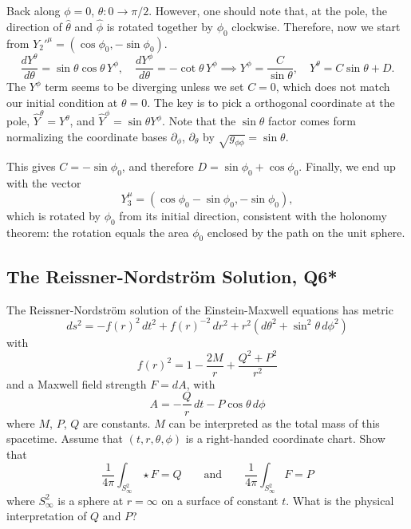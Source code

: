 \begin{solution}
    Back along $\phi = 0$, $\theta: 0\to\pi/2$. However, one should note that, at the pole, the direction of $\hat{\theta}$ and $\hat{\phi}$ is rotated together by $\phi_0$ clockwise. Therefore, now we start from $Y_2'^\mu = (\cos\phi_0,-\sin\phi_0)$.
    \begin{equation}
        \frac{dY^\theta}{d\theta} = \sin\theta\cos\theta\, Y^\phi, \quad
        \frac{dY^\phi}{d\theta} = -\cot\theta\, Y^\phi \implies  Y^\phi = \frac{C}{\sin\theta}, \quad  Y^\theta = C\sin\theta +D.
    \end{equation}
    The $Y^\phi$ term seems to be diverging unless we set $C=0$, which does not match our initial condition at $\theta=0$. The key is to pick a orthogonal coordinate at the pole, $\hat{Y}^\theta = Y^\theta$, and $\hat{Y}^\phi = \sin\theta Y^\phi$. Note that the $\sin\theta$ factor comes form normalizing the coordinate bases $\partial_\phi$, $\partial_\theta$ by $\sqrt{g_{\phi\phi}}=\sin\theta$.
    
    This gives $C=-\sin\phi_0$, and therefore $D=\sin\phi_0+\cos\phi_0$. Finally, we end up with the vector
    \begin{equation}
        Y_3^\mu = (\cos\phi_0-\sin\phi_0, -\sin\phi_0),
    \end{equation}
    which is rotated by $\phi_0$ from its initial direction, consistent with the holonomy theorem: the rotation equals the area $\phi_0$ enclosed by the path on the unit sphere.

\end{solution}

\subsection{The Reissner-Nordstr\"om Solution, Q6*}

The Reissner-Nordstr\"om solution of the Einstein-Maxwell equations has metric
\begin{equation}
    ds^2 = -f(r)^2\,dt^2 + f(r)^{-2}\,dr^2 + r^2\!\left(d\theta^2 + \sin^2\theta\,d\phi^2\right)
\end{equation}
with
\begin{equation}
    f(r)^2 = 1 - \frac{2M}{r} + \frac{Q^2+P^2}{r^2}
\end{equation}
and a Maxwell field strength $F = dA$, with
\begin{equation}
    A = -\frac{Q}{r}\,dt - P\cos\theta\,d\phi
\end{equation}
where $M$, $P$, $Q$ are constants. $M$ can be interpreted as the total mass of this spacetime. Assume that $(t,r,\theta,\phi)$ is a right-handed coordinate chart. Show that
\begin{equation}
    \frac{1}{4\pi}\int_{S^2_\infty} \star F = Q \qquad \text{and} \qquad \frac{1}{4\pi}\int_{S^2_\infty} F = P
\end{equation}
where $S^2_\infty$ is a sphere at $r=\infty$ on a surface of constant $t$. What is the physical interpretation of $Q$ and $P$?

